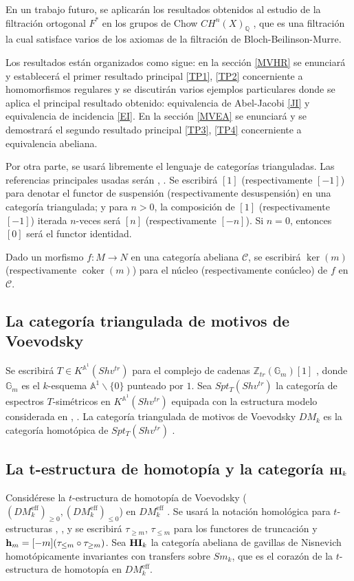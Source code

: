 \documentclass[10pt]{amsart}
\theoremstyle{definition}
\theoremstyle{remark}
\theoremstyle{definition}
\begin{document}
En un trabajo futuro, se aplicarán los resultados obtenidos al estudio de la filtración ortogonal $F^{*}$ en los grupos de Chow $CH^{n}(X)_{\mathbb{Q}}$ \cite{Pel17, GP22, PR25}, que es una filtración la cual satisface varios de los axiomas de la filtración de Bloch-Beilinson-Murre.

Los resultados están organizados como sigue: en la sección \ref{MVHR} se enunciará y establecerá el primer resultado principal \ref{TP1}, \ref{TP2} concerniente a homomorfismos regulares y se discutirán varios ejemplos particulares donde se aplica el principal resultado obtenido: equivalencia de Abel-Jacobi \ref{JI}  y equivalencia de incidencia \ref{EI}. En la sección \ref{MVEA} se enunciará y se demostrará el segundo resultado principal \ref{TP3}, \ref{TP4} concerniente a equivalencia abeliana.

Por otra parte, se usará libremente el lenguaje de categorías trianguladas. Las referencias principales usadas serán \cite{Nee01}, \cite{BBD82}. Se escribirá $[1]$ (respectivamente $[-1]$) para denotar el functor de suspensión (respectivamente desuspensión) en una categoría triangulada; y para $n>0$, la composición de $[1]$ (respectivamente $[-1]$) iterada $n$-veces será $[n]$ (respectivamente $[-n]$). Si $n=0$, entonces $[0]$ será el functor identidad.

Dado un morfismo $f:M\to N$ en una categoría abeliana $\mathcal{C}$, se escribirá $\ker(m)$ (respectivamente $\operatorname{coker}(m)$) para el núcleo (respectivamente conúcleo) de $f$ en $\mathcal{C}$.

\subsection{La categoría triangulada de motivos de Voevodsky}\label{MV}

Se escribirá $T\in K^{\mathbb{A}^{1}}(Shv^{tr})$ para el complejo de cadenas $\mathbb{Z}_{tr}(\mathbb{G}_{m})[1]$ \cite[2.12]{MVW06}, donde $\mathbb{G}_{m}$ es el $k$-esquema $\mathbb{A}^{1}\backslash\{0\}$ punteado por $1$. Sea $Spt_{T}(Shv^{tr})$ la categoría de espectros $T$-simétricos en $K^{\mathbb{A}^{1}}(Shv^{tr})$ equipada con la estructura modelo considerada en \cite[8.7 y 8.11]{Hov01}, \cite[Def. 4.3.29]{Ayo07}. La categoría triangulada de motivos de Voevodsky $DM_{k}$ es la categoría homotópica de $Spt_{T}(Shv^{tr})$ \cite{Voe00b}.


\subsection{La t-estructura de homotopía y la categoría  ${\bf HI}_{k}$}\label{HV} Considérese la $t$-estructura de homotopía de Voevodsky ($(DM^{\textrm{eff}}_{k})_{\geq 0},(DM^{\textrm{eff}}_{k})_{\leq 0}$) en $DM^{\textrm{eff}}_{k}$ \cite[p. 11]{Voe00b}. Se usará la notación homológica para $t$-estructuras \cite[§2.1.3]{Ayo07}, \cite[§1.3]{Ayo11}, y se escribirá $\tau_{\geq m}$, $\tau_{\leq m}$ para los functores de truncación y ${\bf h}_{m}=[-m](\tau_{\leq m}\circ\tau_{\geq m})$. Sea ${\bf HI}_{k}$ la categoría abeliana de gavillas de Nisnevich homotópicamente invariantes con transfers sobre $Sm_{k}$, que es el corazón de la $t$-estructura de homotopía en $DM^{\textrm{eff}}_{k}$.
\end{document}
